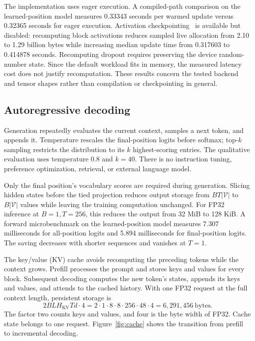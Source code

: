 \documentclass{article}
\begin{document}
The implementation uses eager execution. A compiled-path comparison on the learned-position model measures 0.33343 seconds per warmed update versus 0.32365 seconds for eager execution. Activation checkpointing~\cite{checkpoint} is available but disabled: recomputing block activations reduces sampled live allocation from 2.10 to 1.29 billion bytes while increasing median update time from 0.317603 to 0.414878 seconds. Recomputing dropout requires preserving the device random-number state. Since the default workload fits in memory, the measured latency cost does not justify recomputation. These results concern the tested backend and tensor shapes rather than compilation or checkpointing in general.

\subsection{Autoregressive decoding}
\label{sec:inference}
Generation repeatedly evaluates the current context, samples a next token, and appends it. Temperature rescales the final-position logits before softmax; top-$k$ sampling restricts the distribution to its $k$ highest-scoring entries. The qualitative evaluation uses temperature 0.8 and $k=40$. There is no instruction tuning, preference optimization, retrieval, or external language model.

Only the final position's vocabulary scores are required during generation. Slicing hidden states before the tied projection reduces output storage from $BT|\mathcal V|$ to $B|\mathcal V|$ values while leaving the training computation unchanged. For FP32 inference at $B=1,T=256$, this reduces the output from 32 MiB to 128 KiB. A forward microbenchmark on the learned-position model measures 7.307 milliseconds for all-position logits and 5.894 milliseconds for final-position logits. The saving decreases with shorter sequences and vanishes at $T=1$.

The key/value (KV) cache avoids recomputing the preceding tokens while the context grows. Prefill processes the prompt and stores keys and values for every block. Subsequent decoding computes the new token's states, appends its keys and values, and attends to the cached history. With one FP32 request at the full context length, persistent storage is
\begin{equation}
2BLH_{\mathrm{KV}}Td\cdot4
=2\cdot1\cdot8\cdot8\cdot256\cdot48\cdot4
=6{,}291{,}456\ \mathrm{bytes}.
\label{eq:cache}
\end{equation}
The factor two counts keys and values, and four is the byte width of FP32. Cache state belongs to one request. Figure~\ref{fig:cache} shows the transition from prefill to incremental decoding.
\end{document}
